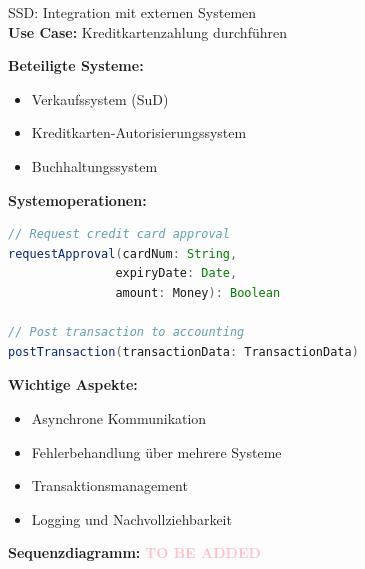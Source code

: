 \begin{example2}{SSD: Integration mit externen Systemen}\\
\textbf{Use Case:} Kreditkartenzahlung durchführen

\textbf{Beteiligte Systeme:}
\begin{itemize}
    \item Verkaufssystem (SuD)
    \item Kreditkarten-Autorisierungssystem
    \item Buchhaltungssystem
\end{itemize}

\textbf{Systemoperationen:}
\begin{lstlisting}[language=Java, style=base]
// Request credit card approval
requestApproval(cardNum: String, 
               expiryDate: Date, 
               amount: Money): Boolean

// Post transaction to accounting
postTransaction(transactionData: TransactionData)
\end{lstlisting}

\textbf{Wichtige Aspekte:}
\begin{itemize}
    \item Asynchrone Kommunikation
    \item Fehlerbehandlung über mehrere Systeme
    \item Transaktionsmanagement
    \item Logging und Nachvollziehbarkeit
\end{itemize}

\textbf{Sequenzdiagramm:} %
\textcolor{pink}{\textbf{TO BE ADDED}}
\end{example2}